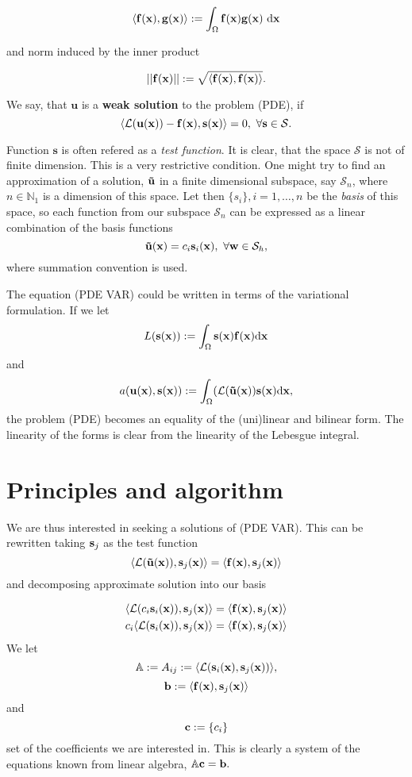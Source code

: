 $$ \langle \mathbf{f}(\mathbf{x}),\mathbf{g}(\mathbf{x}) \rangle := \int_\Omega \mathbf{f}(\mathbf{x}) \mathbf{g}(\mathbf{x}) ~\mathrm{d\mathbf{x}} $$

and norm induced by the inner product

$$||\mathbf{f}(\mathbf{x})|| := \sqrt{\langle \mathbf{f}(\mathbf{x}),\mathbf{f}(\mathbf{x})\rangle}.$$

We say, that $\mathbf{u}$ is a \textbf{weak solution} to the problem (PDE), if
$$ \langle \mathcal{L}(\mathbf{u}(\mathbf{x})) - \mathbf{f}(\mathbf{x}), \mathbf{s}(\mathbf{x}) \rangle = 0,~\forall \mathbf{s}\in\mathcal{S}. $$

\par Function $\mathbf{s}$ is often refered as a \textit{test function}. It is clear, that the space $\mathcal{S}$ is not of finite dimension. This is a very restrictive condition. 
One might try to find an approximation of a solution, $\mathbf{\tilde u}$ in a finite dimensional subspace, say $\mathcal{S}_n$, where $n \in \mathbb{N}_1$ is a dimension of this space. Let then $\{s_i\}, i=1,\ldots,n$
be the \textit{basis} of this space, so each function from our subspace $\mathcal{S}_n$ can be expressed as a linear combination of the basis functions
$$ \mathbf{\tilde u(\mathbf{x})} = c_i\mathbf s_i(\mathbf{x}),~ \forall \mathbf{w} \in \mathcal{S}_h, $$
where summation convention is used.

\par The equation (PDE VAR) could be written in terms of the variational formulation. If we let
$$ L(\mathbf{s}(\mathbf{x})) := \int_\Omega \mathbf{s} (\mathbf{x}) \mathbf{f}(\mathbf{x}) \mathrm d \mathbf{x} $$
and
$$ a(\mathbf{u}(\mathbf{x}), \mathbf{s}(\mathbf{x})) := \int_\Omega (\mathcal L (\mathbf{\tilde u(\mathbf{x})}) \mathbf{s} (\mathbf{x}) \mathrm d \mathbf{x}, $$
the problem (PDE) becomes an equality of the (uni)linear and bilinear form. The linearity of the forms is clear from the linearity of the Lebesgue integral. 

\section{Principles and algorithm}

\par We are thus interested in seeking a solutions of (PDE VAR). This can be rewritten taking $\mathbf{s}_j$ as the test function
$$ \langle \mathcal L (\mathbf{\tilde u(\mathbf{x})}), \mathbf{s}_j(\mathbf{x}) \rangle = \langle \mathbf{f}(\mathbf{x}), \mathbf{s}_j(\mathbf{x}) \rangle $$
and decomposing approximate solution into our basis

\begin{align*}
\langle \mathcal L (c_i \mathbf{s}_i(\mathbf{x})), \mathbf{s}_j(\mathbf{x}) \rangle &= \langle \mathbf{f}(\mathbf{x}), \mathbf{s}_j(\mathbf{x}) \rangle \\
c_i \langle \mathcal L (\mathbf{s}_i(\mathbf{x})), \mathbf{s}_j(\mathbf{x}) \rangle &= \langle \mathbf{f}(\mathbf{x}), \mathbf{s}_j(\mathbf{x}) \rangle
\end{align*}
We let
$$ \mathbb{A} := A_{ij} := \langle \mathcal L(\mathbf{s}_i(\mathbf{x}), \mathbf{s}_j(\mathbf{x})) \rangle, $$
$$ \mathbf{b} := \langle \mathbf{f}(\mathbf{x}), \mathbf{s}_j(\mathbf{x}) \rangle $$
and 
$$ \mathbf{c} := \{c_i\} $$
set of the coefficients we are interested in. This is clearly a system of the equations known from linear algebra, $\mathbb{A} \mathbf{c} = \mathbf{b}.$

